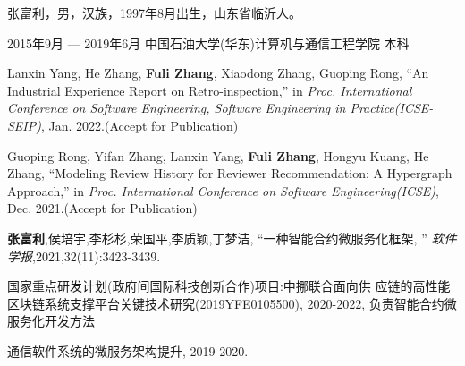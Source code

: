 \documentclass[macfonts,master,oneside]{njuthesis}
\begin{document}

\backmatter
\begin{resume}
  \begin{authorinfo}
    \noindent 张富利，男，汉族，1997年8月出生，山东省临沂人。
  \end{authorinfo}
  \begin{education}
    \item[2015年9月 --- 2019年6月] 中国石油大学(华东)计算机与通信工程学院 \hfill 本科
  \end{education}
  \begin{publications}

      \item Lanxin Yang, He Zhang, \textbf{Fuli Zhang}, Xiaodong Zhang, Guoping Rong, ``An Industrial Experience Report on Retro-inspection,'' in \textsl{Proc. International Conference on Software Engineering, Software Engineering in Practice(ICSE-SEIP)}, Jan. 2022.(Accept for Publication)

      \item Guoping Rong, Yifan Zhang, Lanxin Yang, \textbf{Fuli Zhang}, Hongyu Kuang, He Zhang, ``Modeling Review History for Reviewer Recommendation: A Hypergraph Approach,'' in \textsl{Proc. International Conference on Software Engineering(ICSE)}, Dec. 2021.(Accept for Publication)

      \item \textbf{张富利},侯培宇,李杉杉,荣国平,李质颖,丁梦洁, ``一种智能合约微服务化框架, '' \textsl{软件学报},2021,32(11):3423-3439.

  \end{publications}
 

  \begin{projects}
    \item 国家重点研发计划(政府间国际科技创新合作)项目:中挪联合面向供
应链的高性能区块链系统支撑平台关键技术研究(2019YFE0105500), 2020-2022, 负责智能合约微服务化开发方法
    \item 通信软件系统的微服务架构提升, 2019-2020.

  \end{projects}
\end{resume}


\end{document}
